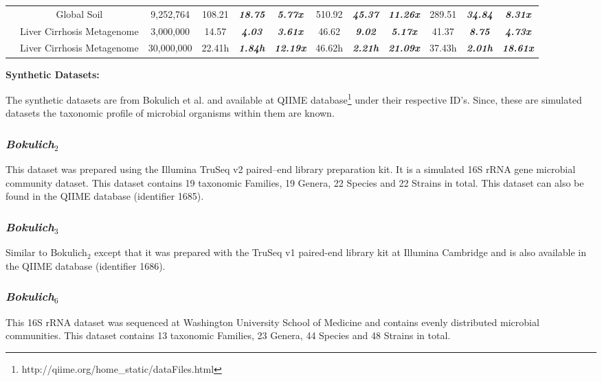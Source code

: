 \documentclass[10pt, conference, compsocconf]{IEEEtran}
\begin{document}
\begin{table}
{\begin{tabular}{|c c c|c c c|c c c|c c c|}
			& Global Soil & 9,252,764 & 108.21 &  \textit{\textbf{18.75}} & \textit{\textbf{5.77x}} & 510.92 & \textit{\textbf{45.37}} & \textit{\textbf{11.26x}} & 289.51 &  \textit{\textbf{34.84}} & \textit{\textbf{8.31x}}\\
			
			& Liver Cirrhosis Metagenome & 3,000,000 & 14.57 &  \textit{\textbf{4.03}} & \textit{\textbf{3.61x}} & 46.62 & \textit{\textbf{9.02}} & \textit{\textbf{5.17x}} & 41.37 &  \textit{\textbf{8.75}} & \textit{\textbf{4.73x}}\\
			
			& Liver Cirrhosis Metagenome & 30,000,000 & 22.41h &  \textit{\textbf{1.84h}} & \textit{\textbf{12.19x}} & 46.62h & \textit{\textbf{2.21h}} & \textit{\textbf{21.09x}} & 37.43h &  \textit{\textbf{2.01h}} & \textit{\textbf{18.61x}}\\		
			
			\hline 
			
		\end{tabular}
	}
\end{table} 



\textbf{Synthetic Datasets:}

The synthetic datasets are 
from Bokulich et al. \cite{MARmockDatasetRef} and 
available at 
QIIME database\footnote{http://qiime.org/home\_static/dataFiles.html} under their respective ID's. Since, these 
are simulated datasets the taxonomic profile of microbial organisms within them are known.

\subsubsection{\textit{Bokulich$_2$}}
This dataset was prepared using the 
Illumina TruSeq v2 paired--end library
preparation kit. It is a simulated 16S rRNA gene 
microbial community dataset.
This 
dataset contains 19 taxonomic Families, 19 Genera, 22 Species 
and 22 Strains in total. This dataset can also be 
found in the QIIME database (identifier 1685).

\subsubsection{\textit{Bokulich$_3$}}
Similar to Bokulich$_2$ except that it was 
prepared with the 
TruSeq v1 paired-end library kit at 
Illumina Cambridge and is  also available in the 
QIIME database (identifier 1686).

\subsubsection{\textit{Bokulich$_6$}}
This  16S rRNA dataset 
was sequenced at Washington University School of Medicine and 
contains evenly distributed microbial communities. This dataset contains 13 taxonomic Families, 23 Genera, 44 Species and 48 Strains in total.
\end{document}
